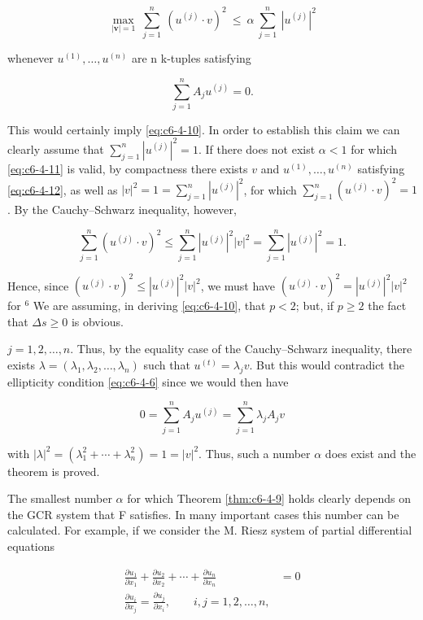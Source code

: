 \begin{equation}\label{eq:c6-4-11}
\max_{|\boldsymbol{v}|=1}\ \sum_{j=1}^{n}\ (u^{(j)}\cdot v)^{2}\ \leq\ \alpha\ \sum_{j=1}^{n}\ |u^{(j)}|^{2}
\end{equation}

whenever $u^{(1)}, \ldots, u^{(n)}$ are n k-tuples satisfying

\begin{equation}\label{eq:c6-4-12}
\sum_{j=1}^{n}A_{j}u^{(j)}=0.
\end{equation}

This would certainly imply \eqref{eq:c6-4-10}. In order to establish this claim we can clearly assume that $\sum_{j=1}^{n}|u^{(j)}|^2=1$. If there does not exist $\alpha<1$ for which \eqref{eq:c6-4-11} is valid, by compactness there exists $v$ and $u^{(1)},\ldots,u^{(n)}$ satisfying \eqref{eq:c6-4-12}, as well as $|v|^2=1=\sum_{j=1}^{n}|u^{(j)}|^2$, for which $\sum_{j=1}^{n}(u^{(j)}\cdot v)^2=1$. By the Cauchy--Schwarz inequality, however,

\[
\sum_{j=1}^{n}(u^{(j)}\cdot v)^{2}\leq\sum_{j=1}^{n}|u^{(j)}|^{2}|v|^{2}=\sum_{j=1}^{n}|u^{(j)}|^{2}=1.
\]

Hence, since $(u^{(j)}\cdot v)^2 \leq |u^{(j)}|^2|v|^2$, we must have $(u^{(j)}\cdot v)^2 = |u^{(j)}|^2|v|^2$ for $^6$ We are assuming, in deriving \eqref{eq:c6-4-10}, that $p < 2$; but, if $p \geq 2$ the fact that $\Delta s \geq 0$ is obvious.

$j = 1, 2, \ldots, n$. Thus, by the equality case of the Cauchy--Schwarz inequality, there exists $\lambda = (\lambda_1, \lambda_2, \ldots, \lambda_n)$ such that $u^{(t)} = \lambda_j v$. But this would contradict the ellipticity condition \eqref{eq:c6-4-6} since we would then have

\[
0=\sum_{j=1}^{n}A_{j}u^{(j)}=\sum_{j=1}^{n}\lambda_{j}A_{j}v
\]

with $|\lambda|^2 = (\lambda_1^2 + \cdots + \lambda_n^2) = 1 = |v|^2$. Thus, such a number $\alpha$ does exist and the theorem is proved.

The smallest number $\alpha$ for which Theorem \ref{thm:c6-4-9} holds clearly depends on the GCR system that F satisfies. In many important cases this number can be calculated. For example, if we consider the M. Riesz system of partial differential equations

\begin{equation}\label{eq:c6-4-13}
\begin{aligned}\frac{\partial u_{1}}{\partial x_{1}}+\frac{\partial u_{2}}{\partial x_{2}}+\cdots+\frac{\partial u_{n}}{\partial x_{n}}&=0\\\frac{\partial u_{i}}{\partial x_{j}}=\frac{\partial u_{j}}{\partial x_{i}},\qquad i,j=1,2,\ldots,n,\end{aligned}
\end{equation}

